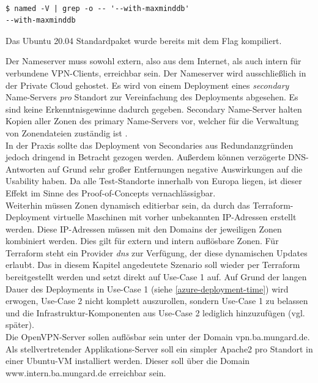 \begin{listing}[h]
\begin{verbatim}

$ named -V | grep -o -- '--with-maxminddb'
--with-maxminddb

\end{verbatim}
\caption{Das Ubuntu 20.04 Standardpaket wurde bereits mit dem Flag kompiliert.}
\label{bind-mmdb-compiler-flag}
\end{listing}
Der Nameserver muss sowohl extern, also aus dem Internet, als auch intern für verbundene VPN-Clients, erreichbar sein. Der Nameserver wird ausschließlich in der Private Cloud gehostet. Es wird von einem \gls{Deployment} eines \textit{secondary} Name-Servers \textit{pro} Standort zur Vereinfachung des \gls{Deployments} abgesehen. Es sind keine Erkenntnisgewinne dadurch gegeben. Secondary Name-Server halten Kopien aller Zonen des primary Name-Servers vor, welcher für die Verwaltung von Zonendateien zuständig ist \cite[S.517]{Fall2011}.\\
In der Praxis sollte das \gls{Deployment} von \glqq Secondaries\grqq{} aus Redundanzgründen jedoch dringend in Betracht gezogen werden. Außerdem können \glqq verzögerte\grqq{} DNS-Antworten auf Grund sehr großer Entfernungen negative Auswirkungen auf die Usability haben. Da alle Test-Standorte innerhalb von Europa liegen, ist dieser Effekt im Sinne des Proof-of-Concepts vernachlässigbar.\\
Weiterhin müssen Zonen dynamisch editierbar sein, da durch das Terraform-Deployment virtuelle Maschinen mit vorher unbekannten IP-Adressen erstellt werden. Diese IP-Adressen müssen mit den Domains der jeweiligen Zonen kombiniert werden. Dies gilt für extern und intern auflösbare Zonen. Für Terraform steht ein Provider \textit{dns} zur Verfügung, der diese dynamischen Updates erlaubt\cite{dnstf2021}.
Das in diesem Kapitel angedeutete Szenario soll wieder per Terraform bereitgestellt werden und setzt direkt auf Use-Case 1 auf. Auf Grund der langen Dauer des \gls{Deployments} in Use-Case 1 (siehe \ref{azure-deployment-time}) wird erwogen, Use-Case 2 nicht \glqq komplett\grqq{} auszurollen, sondern Use-Case 1 zu belassen und die Infrastruktur-Komponenten aus Use-Case 2 lediglich hinzuzufügen (vgl. später).\\
Die OpenVPN-Server sollen auflösbar sein unter der Domain vpn.ba.mungard.de.\\
Als stellvertretender \glqq Applikations-Server\grqq{} soll ein simpler Apache2 pro Standort in einer Ubuntu-VM installiert werden. Dieser soll über die Domain www.intern.ba.mungard.de erreichbar sein.
%
